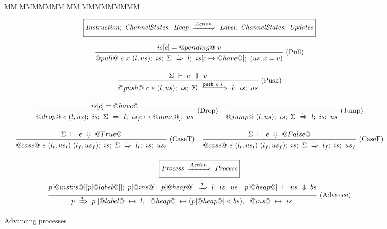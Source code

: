 
\begin{figure}
\begin{tabbing}
MM \= MMMMMMM \= MM \= MMMMMMMMM\kill
\end{tabbing}


$$
  \boxed{
    \textit{Instruction};~\textit{ChannelStates};~\textit{Heap}~\xRightarrow{\textit{Action}}~\textit{Label};~\textit{ChannelStates};~\textit{Updates}
  }
$$

$$
\enskip \frac {\displaystyle 
  is[c] = @pending@~v
} {\displaystyle 
  @pull@~c~x~(l,us);~is;~\Sigma~\xRightarrow{\cdot}~l;~is[c \mapsto @have@];~(us, x = v)
} \  \mbox{(Pull)} \enskip
$$

$$
\enskip \frac {\displaystyle 
  \Sigma~\vdash~e~\Downarrow~v
} {\displaystyle 
  @push@~c~e~(l,us);~is;~\Sigma~\xRightarrow{\texttt{push}~c~v}~l;~is;~us
} \  \mbox{(Push)} \enskip
$$

$$
\enskip \frac {\displaystyle 
  is[c] = @have@
} {\displaystyle 
  @drop@~c~(l,us);~is;~\Sigma~\xRightarrow{\cdot}~l;~is[c \mapsto @none@];~us
} \  \mbox{(Drop)} \enskip
\enskip \frac {\displaystyle 
} {\displaystyle 
  @jump@~(l,us);~is;~\Sigma~\xRightarrow{\cdot}~l;~is;~us
} \  \mbox{(Jump)} \enskip
$$

$$
\enskip \frac {\displaystyle 
  \Sigma~\vdash~e~\Downarrow~@True@
} {\displaystyle 
  @case@~e~(l_t,us_t)~(l_f,us_f);~is;~\Sigma~\xRightarrow{\cdot}~l_t;~is;~us_t
} \  \mbox{(CaseT)} \enskip
\enskip \frac {\displaystyle 
  \Sigma~\vdash~e~\Downarrow~@False@
} {\displaystyle 
  @case@~e~(l_t,us_t)~(l_f,us_f);~is;~\Sigma~\xRightarrow{\cdot}~l_f;~is;~us_f
} \  \mbox{(CaseF)} \enskip
$$

\vspace{2em}

$$
  \boxed{\textit{Process}~\xRightarrow{\textit{Action}}~\textit{Process}}
$$
$$
\enskip \frac {\displaystyle 
  p[@instrs@][p[@label@]];~p[@ins@];~p[@heap@]~\xRightarrow{a}~l;~is;~us
  \quad
    p[@heap@]~\vdash~us~\Downarrow~bs
} {\displaystyle 
  p~\xRightarrow{a}~p~[    @label@~ \mapsto ~l
           , ~~ @heap@~  \mapsto (p[@heap@] \lhd bs)
           , ~~ @ins@~   \mapsto ~is]
} \  \mbox{(Advance)} \enskip
$$


\caption{Advancing processes}

\label{fig:Process:Eval:Shake}
\end{figure}

